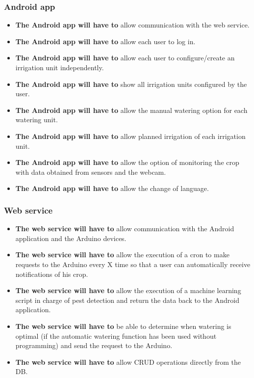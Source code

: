 \documentclass[11pt,a4paper]{article}
\begin{document}
\subsubsection{Android app}
\begin{itemize}
\item \textbf{The Android app will have to} allow communication with the web service.

\item \textbf{The Android app will have to} allow each user to log in.

\item \textbf{The Android app will have to} allow each user to configure/create an irrigation unit independently.

\item \textbf{The Android app will have to} show all irrigation units configured by the user.

\item \textbf{The Android app will have to} allow the manual watering option for each watering unit.

\item \textbf{The Android app will have to} allow planned irrigation of each irrigation unit.

\item \textbf{The Android app will have to} allow the option of monitoring the crop with data obtained from sensors and the webcam.

\item \textbf{The Android app will have to} allow the change of language.
\end{itemize}

\subsubsection{Web service}
\begin{itemize}
\item \textbf{The web service will have to} allow communication with the Android application and the Arduino devices.

\item \textbf{The web service will have to} allow the execution of a cron to make requests to the Arduino every X time so that a user can automatically receive notifications of his crop.

\item \textbf{The web service will have to} allow the execution of a machine learning script in charge of pest detection and return the data back to the Android application.

\item \textbf{The web service will have to} be able to determine when watering is optimal (if the automatic watering function has been used without programming) and send the request to the Arduino.

\item \textbf{The web service will have to} allow CRUD operations directly from the DB.
\end{itemize}
\end{document}
